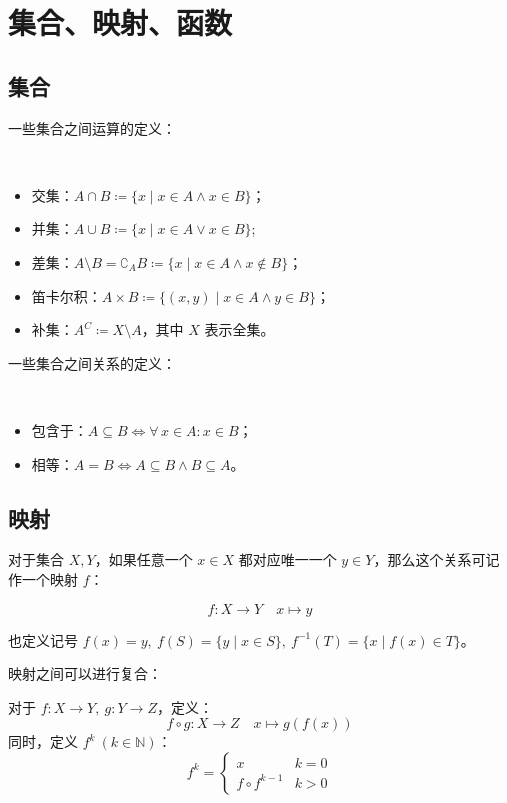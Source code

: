 \section{集合、映射、函数}

\subsection{集合}

一些集合之间运算的定义：

\begin{definition}[集合运算]
	\ 
	\begin{itemize}
		\item 交集：$A \cap B \coloneqq \{x \mid x \in A \land x \in B\}$；
		\item 并集：$A \cup B \coloneqq \{x \mid x \in A \lor x \in B\}$;
		\item 差集：$A \setminus B = \complement_{A} B \coloneqq \{x \mid x \in A \land x \notin B\}$；
		\item 笛卡尔积：$A \times B \coloneqq \{(x,y) \mid x \in A \land y \in B\}$；
		\item 补集：$A^C \coloneqq X \setminus A$，其中 $X$ 表示全集。
	\end{itemize}
\end{definition}

一些集合之间关系的定义：

\begin{definition}[集合关系]
	\ 
	\begin{itemize}
		\item 包含于：$A \subseteq B \Leftrightarrow \forall \, x \in A: x \in B$；
		\item 相等：$A = B \Leftrightarrow A \subseteq B \land B \subseteq A$。
	\end{itemize}
\end{definition}

\subsection{映射}

对于集合 $X,Y$，如果任意一个 $x \in X$ 都对应唯一一个 $y \in Y$，那么这个关系可记作一个映射 $f$：

$$
f: X \rightarrow Y \quad x \mapsto y
$$

也定义记号 $f(x) = y,\ f(S) = \{y \mid x \in S\},\ f^{-1}(T) = \{x \mid f(x) \in T\}$。

映射之间可以进行复合：

\begin{definition}[复合映射]
	对于 $f: X \rightarrow Y,\ g: Y \rightarrow Z$，定义：
	$$
	f \circ g: X \rightarrow Z \quad x \mapsto g(f(x))
	$$
	同时，定义 $f^k\ (k \in \mathbb{N})$：
	$$
	f^k = \begin{cases}
		x & k = 0 \\
		f \circ f^{k-1} & k > 0
	\end{cases}
	$$
\end{definition}

